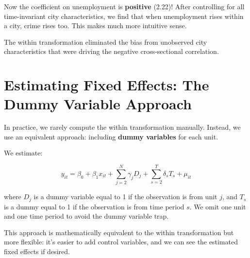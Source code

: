 \documentclass[
  letterpaper,
  DIV=11,
  numbers=noendperiod]{scrreprt}
\newenvironment{Shaded}{\begin{snugshade}}{\end{snugshade}}
\newcommand{\AttributeTok}[1]{\textcolor[rgb]{0.40,0.45,0.13}{#1}}
\newcommand{\CommentTok}[1]{\textcolor[rgb]{0.37,0.37,0.37}{#1}}
\newcommand{\DecValTok}[1]{\textcolor[rgb]{0.68,0.00,0.00}{#1}}
\newcommand{\FunctionTok}[1]{\textcolor[rgb]{0.28,0.35,0.67}{#1}}
\newcommand{\NormalTok}[1]{\textcolor[rgb]{0.00,0.23,0.31}{#1}}
\newcommand{\OtherTok}[1]{\textcolor[rgb]{0.00,0.23,0.31}{#1}}
\newcommand{\SpecialCharTok}[1]{\textcolor[rgb]{0.37,0.37,0.37}{#1}}
\begin{document}
Now the coefficient on unemployment is \textbf{positive} (2.22)! After
controlling for all time-invariant city characteristics, we find that
when unemployment rises within a city, crime rises too. This makes much
more intuitive sense.

The within transformation eliminated the bias from unobserved city
characteristics that were driving the negative cross-sectional
correlation.

\section{Estimating Fixed Effects: The Dummy Variable
Approach}\label{estimating-fixed-effects-the-dummy-variable-approach}

In practice, we rarely compute the within transformation manually.
Instead, we use an equivalent approach: including \textbf{dummy
variables} for each unit.

We estimate:

\[
y_{it} = \beta_0 + \beta_1 x_{it} + \sum_{j=2}^{N} \gamma_j D_j + \sum_{s=2}^{T} \delta_s T_s + \mu_{it}
\]

where \(D_j\) is a dummy variable equal to 1 if the observation is from
unit \(j\), and \(T_s\) is a dummy equal to 1 if the observation is from
time period \(s\). We omit one unit and one time period to avoid the
dummy variable trap.

This approach is mathematically equivalent to the within transformation
but more flexible: it's easier to add control variables, and we can see
the estimated fixed effects if desired.

\begin{Shaded}
\end{Shaded}
\end{document}
